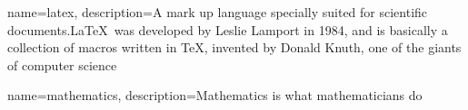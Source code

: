 \RequirePackage{glossaries}
\makeglossaries


{
    name=latex,
    description={A mark up language specially suited 
    for scientific documents.\LaTeX\ was developed by Leslie Lamport in 1984, and is basically a collection of macros written in \TeX, invented by Donald Knuth, one of the giants of computer science}
}

{
    name=mathematics,
    description={Mathematics is what mathematicians do}
}




